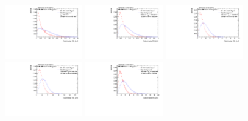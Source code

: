 \begin{figure}[H]
\bigskip
\includegraphics[width=0.3\textwidth]{sascha_input/Appendix/Distributions/higgs/distributions/beta2/h_recoJet_D2_2_bin1.pdf} \hspace{1mm}
\includegraphics[width=0.3\textwidth]{sascha_input/Appendix/Distributions/higgs/distributions/beta2/h_recoJet_D2_2_bin2.pdf} \hspace{4mm}
\includegraphics[width=0.3\textwidth]{sascha_input/Appendix/Distributions/higgs/distributions/beta2/h_recoJet_D2_2_bin3.pdf} 
\bigskip
\includegraphics[width=0.3\textwidth]{sascha_input/Appendix/Distributions/higgs/distributions/beta2/h_recoJet_D2_2_bin4.pdf} \hspace{4mm}
\includegraphics[width=0.3\textwidth]{sascha_input/Appendix/Distributions/higgs/distributions/beta2/h_recoJet_D2_2_bin5.pdf} 


\end{figure}
